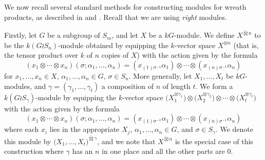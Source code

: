 \documentclass[ALCO,Unicode,published]{cedram}
\begin{document}
We now recall several standard methods for constructing modules for wreath products, as described in
\cite[Section 4.3]{JAMKER} and \cite[Section 3]{CHTAN}. Recall that we are using \textit{right} modules.

Firstly, let $G$ be a subgroup of $S_m$, and
let $X$ be a $kG$-module. We define $X^{\widetilde\boxtimes n}$ to be the $k(G{\wr}S_n)$-module obtained by
equipping the $k$-vector space $X^{\otimes n}$ (that is, the tensor product over $k$ of $n$ copies of $X$) with the action given by the
formula
\[
	(x_1\otimes\cdots\otimes x_n)(\sigma;\alpha_1,\ldots,\alpha_n) = (x_{(1)\sigma^{-1}}\alpha_1)\otimes\cdots
	\otimes(x_{(n)\sigma^{-1}}\alpha_n)
\]
for $x_1,\ldots,x_n \in X$, $\alpha_1,\ldots,\alpha_n \in G$, $\sigma \in S_n$.
More generally, let $X_1,\ldots,X_t$ be $kG$-modules, and $\gamma = (\gamma_1,\ldots,\gamma_t)$ a composition of $n$ of length $t$.
We form a $k(G{\wr}S_{\gamma})$-module by equipping the $k$-vector space
$\bigl(X^{\otimes \gamma_1}_1\bigr)\otimes\bigl(X^{\otimes \gamma_2}_2\bigr)\otimes\cdots\otimes\bigl(X^{\otimes \gamma_t}_t\bigr)$
with the action given by the formula
\[
	(x_1\otimes\cdots\otimes x_n)(\sigma;\alpha_1,\ldots,\alpha_n) = (x_{(1)\sigma^{-1}}\alpha_1)\otimes\cdots
	\otimes(x_{(n)\sigma^{-1}}\alpha_n)
\]
where each $x_i$ lies in the appropriate $X_j$, $\alpha_1,\ldots,\alpha_n \in G$, and $\sigma \in S_{\gamma}$. We denote this module by
$\bigl(X_1,\ldots,X_t\bigr)^{\widetilde\boxtimes \gamma}$, and we note that $X^{\widetilde\boxtimes n}$ is the
special case of this construction where $\gamma$ has an $n$ in one place and all the other parts are 0.
\end{document}
